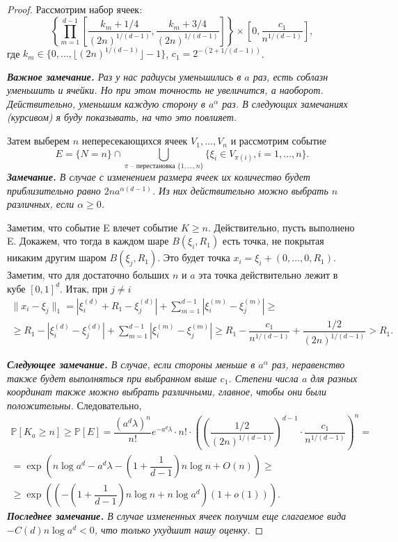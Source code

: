 \documentclass[12pt]{article}
\theoremstyle{plain}
\theoremstyle{definition}
\theoremstyle{remark}
\def\geq{\geqslant}
\newcommand{\PP}{\mathbb{P}}
\begin{document}
\begin{proof}
    Рассмотрим набор ячеек: $$\left\{\prod\limits_{m=1}^{d-1}\left[\dfrac{k_m+1/4}{(2n)^{1/(d-1)}}, \dfrac{k_m+3/4}{(2n)^{1/(d-1)}}\right]\right\} \times \left[0, \dfrac{c_1}{n^{1/(d-1)}}\right],$$
    где $k_m \in \{0, \ldots, \lfloor (2n)^{1/(d-1)}\rfloor-1\}$, $c_1 = 2^{-(2+1/(d-1))}$. 
    
    {\it {\bf Важное замечание.}  Раз у нас радиусы уменьшились в $a$ раз, есть соблазн уменьшить и ячейки. Но при этом точность не увеличится, а наоборот. Действительно, уменьшим каждую сторону в $a^\alpha$ раз. В следующих замечаниях (курсивом) я буду показывать, на что это повлияет.}
    
    Затем выберем $n$ непересекающихся ячеек $V_1, \ldots, V_n$  и рассмотрим событие $$E = \{N=n\}\cap \bigcup\limits_{\pi \text{ -- перестановка } \{1, \ldots, n\}} \{\xi_i \in V_{\pi(i)}, i = 1, \ldots, n\}.$$
    {\it {\bf Замечание.} В случае с изменением размера ячеек их количество будет приблизительно равно $2na^{\alpha(d-1)}$. Из них действительно можно выбрать $n$ различных, если $\alpha \geq 0$.}
                         
    Заметим, что событие E влечет событие $K \geq n$. Действительно, пусть выполнено E. Докажем, что тогда в каждом шаре $B(\xi_i, R_1)$ есть точка, не покрытая никаким другим шаром $B(\xi_j, R_1)$. Это будет точка $x_i = \xi_i + (0, \ldots, 0, R_1)$. Заметим, что для достаточно больших $n$ и $a$ эта точка действительно лежит в кубе $[0, 1]^d$. Итак, при $j \not= i$
    \begin{multline*}
        \|x_i - \xi_j\|_1 = 
        |\xi_i^{(d)} + R_1 - \xi_j^{(d)} | + \sum_{m=1}^{d-1}|\xi_i^{(m)} - \xi_j^{(m)}| \geq\\
        \geq R_1 - |\xi_i^{(d)} - \xi_j^{(d)} | + \sum_{m=1}^{d-1}|\xi_i^{(m)} - \xi_j^{(m)}| \geq
        R_1 - \dfrac{c_1}{n^{1/(d-1)}} + \dfrac{1/2}{(2n)^{1/(d-1)}} > R_1.
    \end{multline*}{}
    
    {\it {\bf Следующее замечание.} В случае, если стороны меньше в $a^\alpha$ раз, неравенство также будет выполняться при выбранном выше $c_1$. Степени числа $a$ для разных координат также можно выбрать различными, главное, чтобы они были положительны.
    }
    Следовательно, 
    \begin{multline*}
        \PP[K_a\geq n] \geq \PP[E] = \dfrac{(a^d\lambda)^n}{n!}e^{-a^d\lambda}\cdot n!\cdot \left(\left(\dfrac{1/2}{(2n)^{1/(d-1)}}\right)^{d-1}\cdot \dfrac{c_1}{n^{1/(d-1)}}\right)^n = \\
        =\exp\left(n\log a^d - a^d\lambda - \left(1+\dfrac{1}{d-1}\right)n\log n + O(n)\right) \geq \\
        \geq
        \exp \left(\left(-\left(1+\dfrac{1}{d-1}\right)n\log n + n\log a^d\right) (1+o(1))\right).
    \end{multline*}{}
    {\it {\bf Последнее замечание.} В случае измененных ячеек получим еще слагаемое вида $-C(d)n\log a^d < 0$, что только ухудшит нашу оценку.}
    
\end{proof}{}
\end{document}

